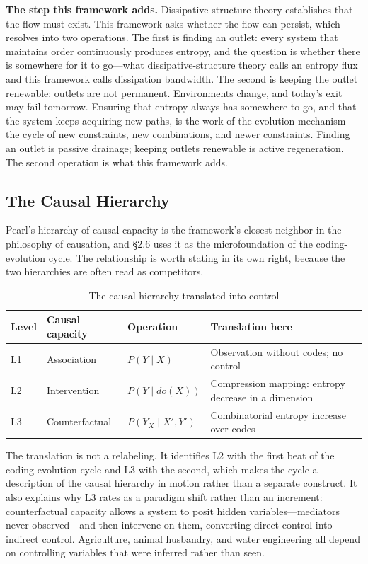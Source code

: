 \documentclass[11pt,a4paper]{article}
\begin{document}
\textbf{The step this framework adds.} Dissipative-structure theory establishes that the flow must exist. This framework asks whether the flow can persist, which resolves into two operations. The first is finding an outlet: every system that maintains order continuously produces entropy, and the question is whether there is somewhere for it to go---what dissipative-structure theory calls an entropy flux and this framework calls dissipation bandwidth. The second is keeping the outlet renewable: outlets are not permanent. Environments change, and today's exit may fail tomorrow. Ensuring that entropy always has somewhere to go, and that the system keeps acquiring new paths, is the work of the evolution mechanism---the cycle of new constraints, new combinations, and newer constraints. Finding an outlet is passive drainage; keeping outlets renewable is active regeneration. The second operation is what this framework adds.

\subsection{The Causal Hierarchy}

Pearl's hierarchy of causal capacity \citep{pearl2009, pearl2018} is the framework's closest neighbor in the philosophy of causation, and \S2.6 uses it as the microfoundation of the coding-evolution cycle. The relationship is worth stating in its own right, because the two hierarchies are often read as competitors.

\begin{table}[h]
\centering
\small
\caption{The causal hierarchy translated into control}
\begin{tabular}{p{0.9cm} p{2.6cm} p{3.4cm} p{6.4cm}}
\hline
\textbf{Level} & \textbf{Causal capacity} & \textbf{Operation} & \textbf{Translation here} \\
\hline
L1 & Association & $P(Y \mid X)$ & Observation without codes; no control \\
L2 & Intervention & $P(Y \mid do(X))$ & Compression mapping: entropy decrease in a dimension \\
L3 & Counterfactual & $P(Y_X \mid X', Y')$ & Combinatorial entropy increase over codes \\
\hline
\end{tabular}
\end{table}

The translation is not a relabeling. It identifies L2 with the first beat of the coding-evolution cycle and L3 with the second, which makes the cycle a description of the causal hierarchy in motion rather than a separate construct. It also explains why L3 rates as a paradigm shift rather than an increment: counterfactual capacity allows a system to posit hidden variables---mediators never observed---and then intervene on them, converting direct control into indirect control. Agriculture, animal husbandry, and water engineering all depend on controlling variables that were inferred rather than seen.
\end{document}
